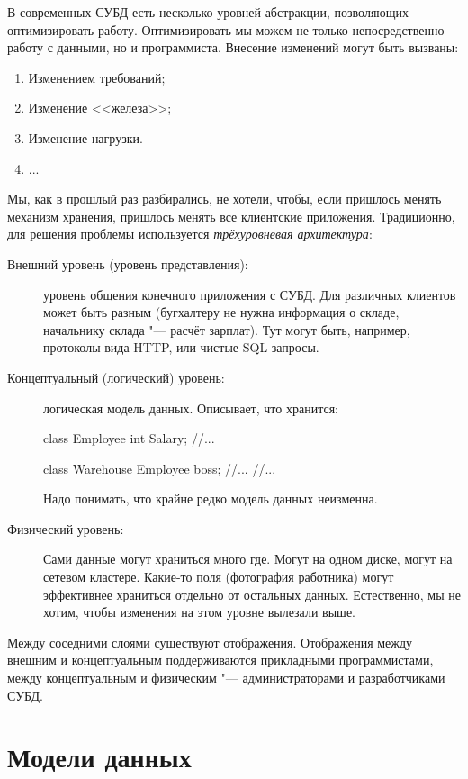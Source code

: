 В современных СУБД есть несколько уровней абстракции, позволяющих оптимизировать работу.
Оптимизировать мы можем не только непосредственно работу с данными, но и программиста.
Внесение изменений могут быть вызваны:
\begin{enumerate}
	\item Изменением требований;
	\item Изменение <<железа>>;
	\item Изменение нагрузки.
	\item ...
\end{enumerate}

Мы, как в прошлый раз разбирались, не хотели, чтобы, если пришлось менять механизм хранения, пришлось менять все клиентские приложения.
Традиционно, для решения проблемы используется \textit{трёхуровневая архитектура}:
\begin{description}
\item[Внешний уровень (уровень представления):] уровень общения конечного приложения с СУБД.
	Для различных клиентов может быть разным (бугхалтеру не нужна информация о складе, начальнику склада "--- расчёт зарплат).
	Тут могут быть, например, протоколы вида HTTP, или чистые SQL-запросы.

\item[Концептуальный (логический) уровень:] логическая модель данных.
	Описывает, что хранится:
	\begin{javacode}
	class Employee {
		int Salary;
		//...
	}

	class Warehouse {
		Employee boss;
		//...
	}
	//...
	\end{javacode}
	Надо понимать, что крайне редко модель данных неизменна.

\item[Физический уровень:]
	Сами данные могут храниться много где.
	Могут на одном диске, могут на сетевом кластере.
	Какие-то поля (фотография работника) могут эффективнее храниться отдельно от остальных данных.
	Естественно, мы не хотим, чтобы изменения на этом уровне вылезали выше.
\end{description}
Между соседними слоями существуют отображения.
Отображения между внешним и концептуальным поддерживаются прикладными программистами,
между концептуальным и физическим "--- администраторами и разработчиками СУБД.

\chapter{Модели данных}

